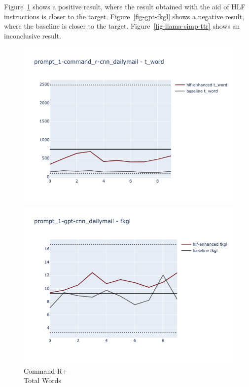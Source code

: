 \documentclass[runningheads,a4paper,11pt]{article}
\begin{document}
Figure~\ref{fig-command-r-t-word} shows a positive result, where the result
obtained with the aid of HLF instructions is closer to the target.
Figure~\ref{fig-gpt-fkgl} shows a negative result, where the baseline is closer
to the target.
Figure~\ref{fig-llama-simp-ttr} shows an inconclusive result.

\begin{figure}[ht!]
    \centering
    \begin{minipage}{0.32\textwidth}
        \includegraphics[width=\linewidth]{plots/prompt_1/prompt_1-command_r-cnn_dailymail/prompt_1-command_r-cnn_dailymail_t_word.png}
        \caption{Command-R+\\Total Words}
        \label{fig-command-r-t-word}
    \end{minipage}
    \hfill
    \begin{minipage}{0.32\textwidth}
        \includegraphics[width=\linewidth]{plots/prompt_1/prompt_1-gpt-cnn_dailymail/prompt_1-gpt-cnn_dailymail_fkgl.png}

\end{minipage}
\end{figure}
\end{document}
